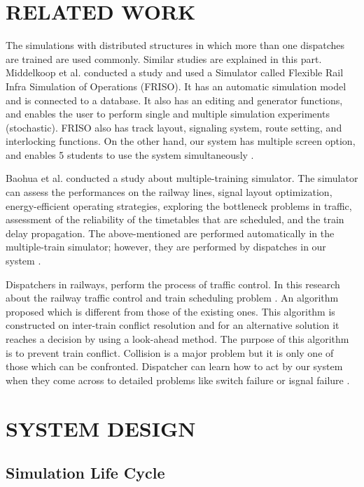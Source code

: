 \documentclass[conference]{IEEEtran}
\begin{document}
\section{RELATED WORK}


The simulations with distributed structures in which more than one dispatches are trained are used commonly. Similar studies are explained in this part. 
Middelkoop et al. conducted a study and used a Simulator called Flexible Rail Infra Simulation of Operations (FRISO). It has an automatic simulation model and is connected to a database. It also has an editing and generator functions, and enables the user to perform single and multiple simulation experiments (stochastic). FRISO also has track layout, signaling system, route setting, and interlocking functions. On the other hand, our system has multiple screen option, and enables 5 students to use the system simultaneously \cite{FRISO}.

 Baohua et al. conducted a study about multiple-training simulator. The simulator can assess the performances on the railway lines, signal layout optimization, energy-efficient operating strategies, exploring the bottleneck problems in traffic, assessment of the reliability of the timetables that are scheduled, and the train delay propagation. The above-mentioned are performed automatically in the multiple-train simulator; however, they are performed by dispatches in our system \cite{ICVES}.

Dispatchers in railways, perform the process of traffic control. In this research about the railway traffic control and train scheduling problem . An algorithm proposed which is different from those of the existing ones. This algorithm is constructed on inter-train conflict resolution and for an alternative solution it reaches a decision by using a look-ahead method. The purpose of this algorithm is to prevent train conflict.
Collision is a major problem but it is only one of those which can be confronted. Dispatcher can learn how to act by our system when they come across to detailed problems like switch failure or isgnal failure \cite{Sahin}.



\section{SYSTEM DESIGN}
\subsection{Simulation Life Cycle}
\end{document}
